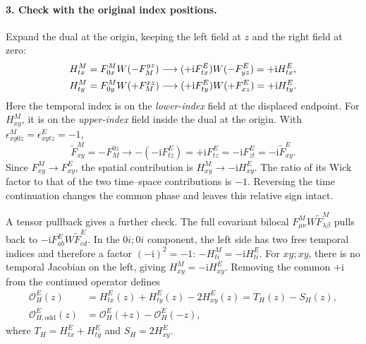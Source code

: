 \documentclass[11pt,a4paper]{article}
\newcommand{\ii}{\mathrm{i}}
\newcommand{\OPE}{\mathcal O}
\newcommand{\TE}{\widetilde F^{E}}
\newcommand{\TM}{\widetilde F^{M}}
\begin{document}
\paragraph{3. Check with the original index positions.}
Expand the dual at the origin, keeping the left field at \(z\) and the
right field at zero:
\begin{align}
 H^M_{tx}&=F^M_{0x}W(-F_M^{yz})
 \longrightarrow(+\ii F^E_{tx})W(-F^E_{yz})=+\ii H^E_{tx},\notag\\
 H^M_{ty}&=F^M_{0y}W(+F_M^{xz})
 \longrightarrow(+\ii F^E_{ty})W(+F^E_{xz})=+\ii H^E_{ty}.
 \label{eq:hel-wick-time}
\end{align}
Here the temporal index is on the \emph{lower-index} field at the displaced
endpoint. For \(H^M_{xy}\), it is on the \emph{upper-index} field inside the
dual at the origin. With \(\epsilon^M_{xy0z}=\epsilon^E_{xytz}=-1\),
\begin{equation}
 \TM_{xy}=-F_M^{0z}
 \longrightarrow-(-\ii F^E_{tz})=+\ii F^E_{tz}
 =-\ii F^E_{zt}=-\ii\TE_{xy}.
 \label{eq:helicity-wick-xy}
\end{equation}
Since \(F^M_{xy}\longrightarrow F^E_{xy}\), the spatial contribution is
\(H^M_{xy}\longrightarrow-\ii H^E_{xy}\). The ratio of its Wick factor to
that of the two time--space contributions is \(-1\). Reversing the time
continuation changes the common phase and leaves this relative sign intact.

A tensor pullback gives a further check. The full covariant bilocal
\(F^M_{\mu\nu}W\TM_{\lambda\beta}\) pulls back to
\(-\ii F^E_{ab}W\TE_{cd}\). In the \(0i;0i\) component, the left side has
two free temporal indices and therefore a factor \((-\ii)^2=-1\):
\(-H^M_{ti}=-\ii H^E_{ti}\). For \(xy;xy\), there is no temporal Jacobian on
the left, giving \(H^M_{xy}=-\ii H^E_{xy}\). Removing the common
\(+\ii\) from the continued operator defines
\begin{align}
 \OPE_H^E(z)&=H^E_{tx}(z)+H^E_{ty}(z)-2H^E_{xy}(z)=T_H(z)-S_H(z),
 \label{eq:hel-comb}\\
 \OPE_{H,\mathrm{odd}}^E(z)&=\OPE_H^E(+z)-\OPE_H^E(-z),
 \label{eq:hel}
\end{align}
where \(T_H=H^E_{tx}+H^E_{ty}\) and \(S_H=2H^E_{xy}\).
\end{document}
